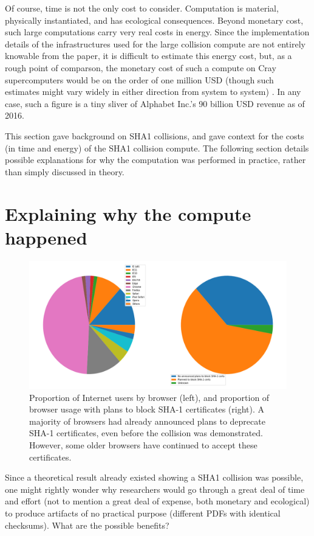 \documentclass[sigconf]{acmart}
\begin{document}
Of course, time is not the only cost to consider.
Computation is material, physically instantiated, and has ecological consequences.
Beyond monetary cost, such large computations carry very real costs in energy.
Since the implementation details of the infrastructures used for the large collision compute are not entirely knowable from the paper,
it is difficult to estimate this energy cost, but, as a rough point of comparson,
the monetary cost of such a compute on Cray supercomputers would be on the order of one million USD 
(though such estimates might vary widely in either direction from system to system)
\cite{Pautsch2016}.
In any case, such a figure is a tiny sliver of Alphabet Inc.'s 90 billion USD revenue as of 2016.

This section gave background on SHA1 collisions, 
and gave context for the costs (in time and energy) of the SHA1 collision compute.
The following section details possible explanations for why the computation was performed
in practice, rather than simply discussed in theory.

\section{Explaining why the compute happened}
\label{sec:org8536c9d}

\begin{figure}
\centering
\includegraphics[width=.9\linewidth]{./figures/browser-share.png}
\caption{Proportion of Internet users by browser (left), and proportion of browser usage with plans to block SHA-1 certificates (right). A majority of browsers had already announced plans to deprecate SHA-1 certificates, even before the collision was demonstrated. However, some older browsers have continued to accept these certificates.}
\end{figure}

Since a theoretical result already existed showing a SHA1 collision was possible, 
one might rightly wonder why researchers would go through a great deal of time and effort
(not to mention a great deal of expense, both monetary and ecological)
to produce artifacts of no practical purpose (different PDFs with identical checksums).
What are the possible benefits?
\end{document}
